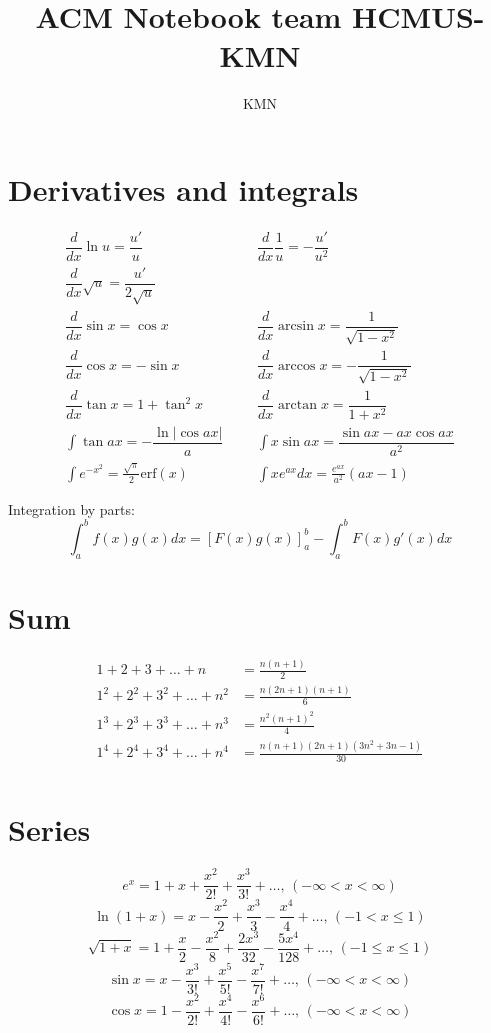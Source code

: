 \documentclass[A4 paper, 12pt]{article}
\title{ACM Notebook team HCMUS-KMN}
\author{KMN}
\begin{document}
	\maketitle
	\newpage
	
	\section{Derivatives and integrals}
	\begin{align*}
        \dfrac{d}{dx}\ln{u} = \dfrac{u'}{u} &&& \dfrac{d}{dx}\dfrac{1}{u} = -\dfrac{u'}{u^2} \\
    	\dfrac{d}{dx}\sqrt u = \dfrac{u'}{2\sqrt u} \\
    	\dfrac{d}{dx}\sin x = \cos x &&& \dfrac{d}{dx}\arcsin x = \dfrac{1}{\sqrt{1-x^2}} \\ 
    	\dfrac{d}{dx}\cos x = -\sin x &&& \dfrac{d}{dx}\arccos x = -\dfrac{1}{\sqrt{1-x^2}} \\
    	\dfrac{d}{dx}\tan x = 1+\tan^2 x &&& \dfrac{d}{dx}\arctan x = \dfrac{1}{1+x^2} \\
    	\int\tan ax = -\dfrac{\ln|\cos ax|}{a} &&& \int x\sin ax = \dfrac{\sin ax-ax \cos ax}{a^2} \\
    	\int e^{-x^2} = \frac{\sqrt \pi}{2} \text{erf}(x) &&& \int xe^{ax}dx = \frac{e^{ax}}{a^2}(ax-1)
	\end{align*}

    Integration by parts:
    \[\int_a^bf(x)g(x)dx = [F(x)g(x)]_a^b-\int_a^bF(x)g'(x)dx\]	
	
	\section{Sum}
	\begin{align*}
    	1 + 2 + 3 + \dots + n &= \frac{n(n+1)}{2} \\
    	1^2 + 2^2 + 3^2 + \dots + n^2 &= \frac{n(2n+1)(n+1)}{6} \\
    	1^3 + 2^3 + 3^3 + \dots + n^3 &= \frac{n^2(n+1)^2}{4} \\
    	1^4 + 2^4 + 3^4 + \dots + n^4 &= \frac{n(n+1)(2n+1)(3n^2 + 3n - 1)}{30} \\
    \end{align*}
    
    \section{Series}
    $$e^x = 1+x+\frac{x^2}{2!}+\frac{x^3}{3!}+\dots,\,(-\infty<x<\infty)$$
    $$\ln(1+x) = x-\frac{x^2}{2}+\frac{x^3}{3}-\frac{x^4}{4}+\dots,\,(-1<x\leq1)$$
    $$\sqrt{1+x} = 1+\frac{x}{2}-\frac{x^2}{8}+\frac{2x^3}{32}-\frac{5x^4}{128}+\dots,\,(-1\leq x\leq1)$$
    $$\sin x = x-\frac{x^3}{3!}+\frac{x^5}{5!}-\frac{x^7}{7!}+\dots,\,(-\infty<x<\infty)$$
    $$\cos x = 1-\frac{x^2}{2!}+\frac{x^4}{4!}-\frac{x^6}{6!}+\dots,\,(-\infty<x<\infty)$$
    
\end{document}
